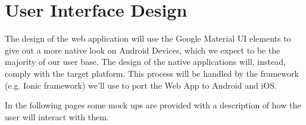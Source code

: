 \section{User Interface Design}

The design of the web application will use the Google Material UI elements to give out a more native look on
Android Devices, which we expect to be the majority of our user base.
The design of the native applications will, instead, comply with the target platform. This process will be handled
by the framework (e.g. Ionic framework) we'll use to port the Web App to Android and iOS.

In the following pages some mock ups are provided with a description of how the user will interact with them.
\newpage







